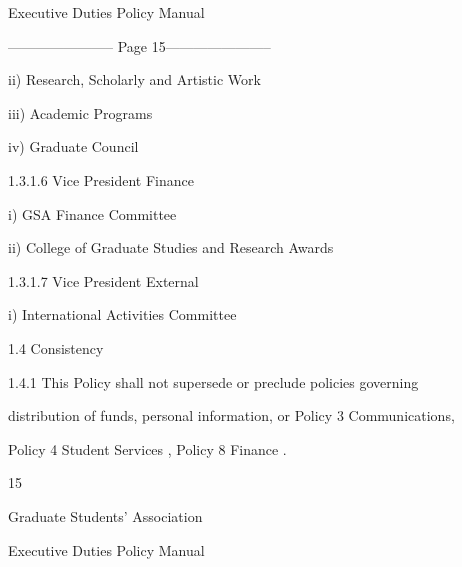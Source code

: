                                       Executive Duties Policy Manual  

  


----------------------- Page 15-----------------------

           ii)        Research, Scholarly and Artistic Work   

  

           iii)       Academic Programs   

  

           iv)        Graduate Council   

  

  

  

 1.3.1.6              Vice President Finance   

  

           i)         GSA Finance Committee   

  

           ii)        College of Graduate Studies and Research Awards   

  

 1.3.1.7              Vice President External   

  

           i)         International Activities Committee   

                               

                             1.4        Consistency  

  

 1.4.1                This Policy  shall not supersede or preclude policies governing  

distribution  of  funds,  personal  information,  or  Policy  3  Communications,  

Policy 4 Student Services , Policy 8 Finance .  

  

  

  

  

  

  

  

  

  

  

  

  

  

  

  



                                                               15  

                                            

                                          Graduate Students’ Association  

                                         Executive Duties Policy Manual  

  

